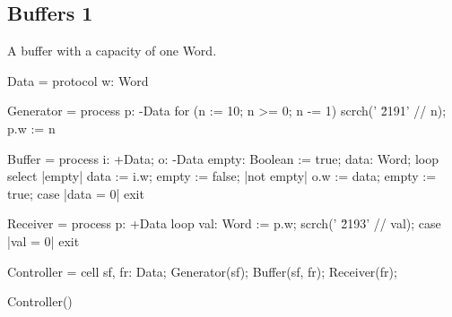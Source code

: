 \subsection{Buffers 1}

A buffer with a capacity of one Word.

\begin{code}
Data = protocol { w: Word }

Generator = process p: -Data 
{
   for (n := 10; n >= 0; n -= 1)
    {
        scrch(' \u2191' // n);
        p.w := n
    }
}

Buffer = process i: +Data; o: -Data 
{
   empty: Boolean := true;
   data: Word;
   loop select 
   {
      |empty|
         data := i.w;
         empty := false;
      |not empty|
         o.w := data;
         empty := true;
         case 
         { 
           |data = 0| 
              exit 
         }
   }
}

Receiver = process p: +Data 
{
   loop 
   {
        val: Word := p.w;
        scrch(' \u2193' // val);
        case
        {   
            |val = 0|
                exit
        }
   }
}

Controller = cell 
{
  sf, fr: Data;
  Generator(sf);
  Buffer(sf, fr);
  Receiver(fr);
}

Controller()
\end{code}
